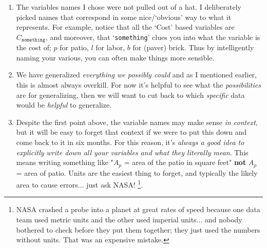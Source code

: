 \documentclass{ximera}
\begin{document}
\begin{exploration}
    \begin{enumerate}
        \item The variables names I chose were not pulled out of a hat. I deliberately picked names that correspond in some nice/`obvious' way to what it represents. For example, notice that all the `Cost' based variables are $C_{\texttt{something}}$, and moreover, that `\texttt{something}' clues you into what the variable is the cost of; $p$ for patio, $l$ for labor, $b$ for (paver) brick. Thus by intelligently naming your various, you can often make things more sensible.
        \item We have generalized \textit{everything we possibly could} and as I mentioned earlier, this is almost always overkill. For now it's helpful to see what the \textit{possibilities} are for generalizing, then we will want to cut back to which \textit{specific} data would be \textit{helpful} to generalize.
        \item Despite the first point above, the variable names may make sense \textit{in context}, but it will be easy to forget that context if we were to put this down and come back to it in six months. For this reason, it's \textit{always a good idea to explicitly write down all your variables and what they literally mean}. This means writing something like "$A_p$ = area of the patio in square feet" \textbf{not} $A_p$ = area of patio. Units are the easiest thing to forget, and typically the  likely area to cause errors... just ask NASA!%
        \footnote{NASA crashed a probe into a planet at great rates of speed because one data team used metric units and the other used imperial units... and nobody bothered to check before they put them together; they just used the numbers without units. That was an expensive mistake.}.
    \end{enumerate}
\end{exploration}
\end{document}
